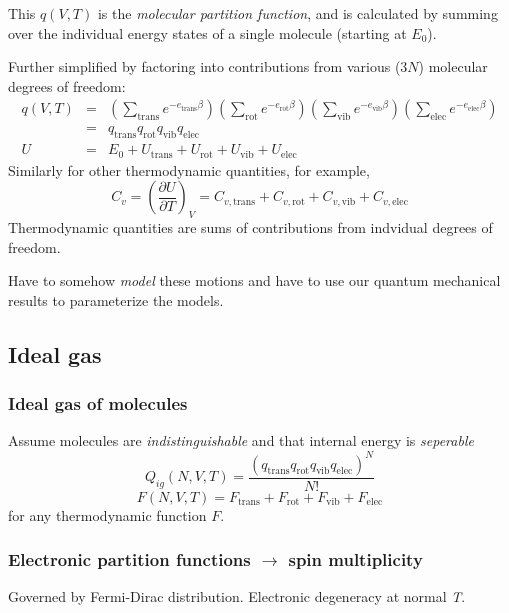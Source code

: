 \documentclass[11pt]{article}
\begin{document}
This \(q(V,T)\) is the \emph{molecular partition function}, and is calculated by
summing over the individual energy states of a single molecule (starting at \(E_0\)).

Further simplified by factoring into contributions from various (\(3N\)) molecular
degrees of freedom:
\begin{eqnarray}
  q(V,T)&=&\left(\sum_\mathrm{trans}
    e^{-e_\mathrm{trans}\beta}\right) \left(\sum_\mathrm{rot}
  e^{-e_\mathrm{rot}\beta}\right) \left( \sum_\mathrm{vib}
  e^{-e_\mathrm{vib}\beta} \right) \left( \sum_\mathrm{elec}
  e^{-e_\mathrm{elec}\beta}\right) \\
&=& q_\mathrm{trans}q_\mathrm{rot}q_\mathrm{vib}q_\mathrm{elec} \\
U & = & E_0 + U_\mathrm{trans}+U_\mathrm{rot}+U_\mathrm{vib}+U_\mathrm{elec}
\end{eqnarray}
Similarly for other thermodynamic quantities, for example,
\begin{equation}
  C_v=\left(\frac{\partial U}{\partial T}\right)_V = C_{v,\mathrm{trans}}+C_{v,\mathrm{rot}}+C_{v,\mathrm{vib}}+C_{v,\mathrm{elec}}
\end{equation}
Thermodynamic quantities are sums of contributions from indvidual degrees of
freedom.

Have to somehow \emph{model} these motions and have to use our quantum
mechanical results to parameterize the models.

\subsection{Ideal gas}
\label{sec:org1c173ac}
\subsubsection{Ideal gas of molecules}
\label{sec:org8b32f76}
Assume molecules are \emph{indistinguishable} and that internal energy is \emph{seperable}
\[  Q_{ig}(N,V,T) = \frac{(q_\mathrm{trans}q_\mathrm{rot}q_\mathrm{vib}q_\mathrm{elec})^N}{N!} \]
\[ F(N,V,T) = F_\mathrm{trans}+ F_\mathrm{rot} + F_\mathrm{vib}+F_\mathrm{elec}\]
for any thermodynamic function \(F\).
\subsubsection{Electronic partition functions \(\rightarrow\) spin multiplicity}
\label{sec:orgb276a80}
Governed by Fermi-Dirac distribution. Electronic degeneracy at normal \emph{T}.
\end{document}
